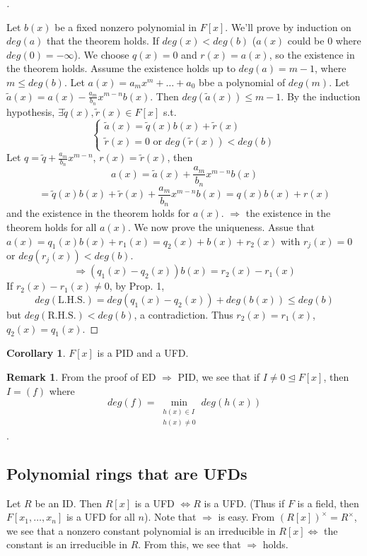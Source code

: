 \documentclass[12pt]{article}
\theoremstyle{definition}
\newtheorem{rem}{Remark}
\newtheorem{cor}{Corollary}
\newenvironment{proofs}[1][\proofname]{%
  \begin{proof}[#1]$ $\par\nobreak\ignorespaces
}{%
  \end{proof}
}
\begin{document}
\begin{proofs}
	Let $b(x)$ be a fixed nonzero polynomial in $F[x]$. We'll prove by induction on $deg(a)$ that the theorem holds. If $deg(x) < deg(b)$ ($a(x)$ could be 0 where $deg(0) = - \infty$). We choose $q(x) = 0$ and $r(x) = a(x)$, so the existence in the theorem holds. Assume the existence holds up to $deg(a) = m - 1$, where $m \leq deg(b)$. Let $a(x) = a_m x^m + \hdots + a_0$ bbe a polynomial of $deg(m)$. Let $\tilde{a}(x) = a(x) - \frac{a_m}{b_n} x^{m - n} b(x)$. Then $deg(\tilde{a}(x)) \leq m - 1$. By the induction hypothesis, $\exists \tilde{q}(x), \tilde{r}(x) \in F[x]$ s.t.
	$$
		\left\{
		\begin{array}{c}
			\tilde{a}(x) = \tilde{q}(x) b(x) + \tilde{r}(x) \\
			\tilde{r}(x) = 0 \text{ or }  deg(\tilde{r}(x)) < deg(b)
		\end{array}
		\right.
	$$
	Let $q = \tilde{q} + \frac{a_m}{b_n} x^{m - n}$, $r(x) = \tilde{r}(x)$, then
	$$a(x) = \tilde{a}(x) + \frac{a_m}{b_n} x^{m - n} b(x) $$
	$$ = \tilde{q}(x) b(x) + \tilde{r}(x) + \frac{a_m}{b_n} x^{m - n} b(x) = q(x) b(x) + r(x)$$
	and the existence in the theorem holds for $a(x)$. $\Rightarrow$ the existence in the theorem holds for all $a(x)$. We now prove the uniqueness. Assue that $a(x) = q_1(x) b(x) + r_1(x) = q_2(x) + b(x) + r_2(x)$ with $r_j(x) = 0$ or $deg(r_j(x)) < deg(b)$.
	$$\Rightarrow (q_1(x) - q_2(x)) b(x) = r_2(x) - r_1(x)$$
	If $r_2(x) - r_1(x) \neq 0$, by Prop. 1,
	$$deg(\text{L.H.S.})  = deg(q_1(x) - q_2(x)) + deg(b(x)) \leq deg(b)$$
	but $deg(\text{R.H.S.}) < deg(b)$, a contradiction. Thus $r_2(x) = r_1(x)$, $q_2(x) = q_1(x)$.
\end{proofs}

\begin{cor}
	$F[x]$ is a PID and a UFD.
\end{cor}

\begin{rem}
	From the proof of ED $\Rightarrow$ PID, we see that if $I \neq 0 \trianglelefteq F[x]$, then $I = (f)$ where
	$$deg(f) = \min_{\substack{h(x) \in I\\h(x) \neq 0}}	 deg(h(x))$$.
\end{rem}


\subsection{Polynomial rings that are UFDs}

Let $R$ be an ID. Then $R[x]$ is a UFD $\Leftrightarrow R$ is a UFD. (Thus if $F$ is a field, then $F[x_1, \hdots, x_n]$ is a UFD for all $n$). Note that $\Rightarrow $ is easy. From $(R[x])^\times = R^\times$, we see that a nonzero constant polynomial is an irreducible in $R[x] \Leftrightarrow$ the constant is an irreducible in $R$. From this, we see that $\Rightarrow$ holds.
\end{document}
